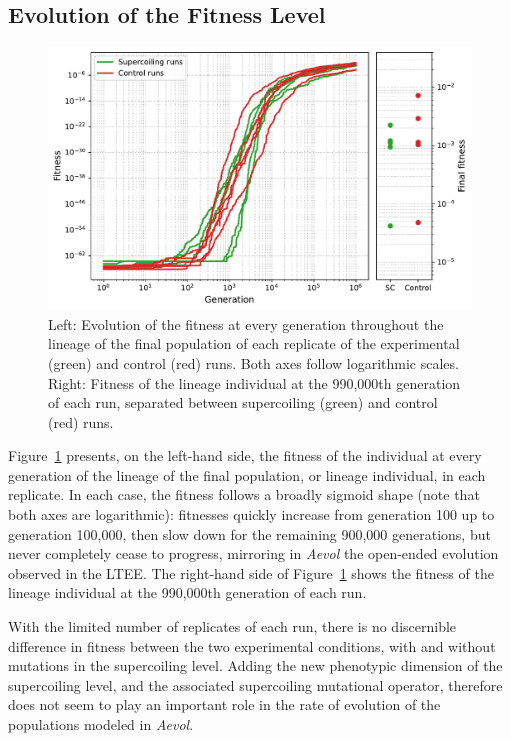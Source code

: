 \subsection{Evolution of the Fitness Level}

\begin{figure}
  \includegraphics[width=\textwidth]{aevol/images/fitness_all.pdf}
  \caption[Evolution of the fitness of the control and experimental runs in \emph{Aevol}]{Left: Evolution of the fitness at every generation throughout the lineage of the final population of each replicate of the experimental (green) and control (red) runs.
  Both axes follow logarithmic scales.
  Right: Fitness of the lineage individual at the 990,000th generation of each run, separated between supercoiling (green) and control (red) runs.}
  \label{fig:aevol:fitness}
\end{figure}

Figure~\ref{fig:aevol:fitness} presents, on the left-hand side, the fitness of the individual at every generation of the lineage of the final population, or lineage individual, in each replicate.
In each case, the fitness follows a broadly sigmoid shape (note that both axes are logarithmic): fitnesses quickly increase from generation 100 up to generation 100,000, then slow down for the remaining 900,000 generations, but never completely cease to progress, mirroring in \emph{Aevol} the open-ended evolution observed in the LTEE.
The right-hand side of Figure~\ref{fig:aevol:fitness} shows the fitness of the lineage individual at the 990,000th generation of each run.

With the limited number of replicates of each run, there is no discernible difference in fitness between the two experimental conditions, with and without mutations in the supercoiling level.
Adding the new phenotypic dimension of the supercoiling level, and the associated supercoiling mutational operator, therefore does not seem to play an important role in the rate of evolution of the populations modeled in \emph{Aevol}.

